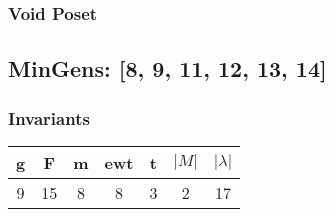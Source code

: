\documentclass[a4paper]{article}
\begin{document}
\hfill\begin{minipage}{0.48\textwidth}
\subsubsection*{Void Poset}
\centering
{}
\end{minipage}
\newpage\subsection{MinGens: [8, 9, 11, 12, 13, 14]}
\noindent\begin{minipage}{0.6\textwidth}
\subsubsection*{Invariants}
\centering
\begin{tabular}{|c|c|c|c|c|c|c|}
\toprule
g & F & m & ewt & t & \(|M|\) & \(|\lambda|\) \\
\midrule
9 & 15 & 8 & 8 & 3 & 2 & 17 \\
\bottomrule
\end{tabular}
\end{minipage}%
\end{document}
